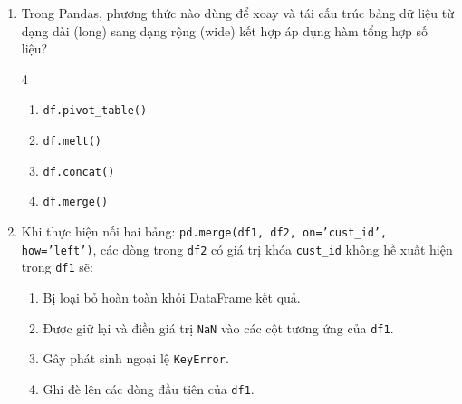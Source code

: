 \documentclass[11pt,a4paper]{article}
\begin{document}
\begin{enumerate}[leftmargin=*,itemsep=2.5pt,resume]
\item Trong Pandas, phương thức nào dùng để xoay và tái cấu trúc bảng dữ liệu từ dạng dài (long) sang dạng rộng (wide) kết hợp áp dụng hàm tổng hợp số liệu?
\begin{multicols}{4}
\begin{enumerate}[label=\Alph*.]
  \item \texttt{df.pivot\_table()}
  \item \texttt{df.melt()}
  \item \texttt{df.concat()}
  \item \texttt{df.merge()}
\end{enumerate}
\end{multicols}

\item Khi thực hiện nối hai bảng: \texttt{pd.merge(df1, df2, on='cust\_id', how='left')}, các dòng trong \texttt{df2} có giá trị khóa \texttt{cust\_id} không hề xuất hiện trong \texttt{df1} sẽ:
\begin{enumerate}[label=\Alph*.]
  \item Bị loại bỏ hoàn toàn khỏi DataFrame kết quả.
  \item Được giữ lại và điền giá trị \texttt{NaN} vào các cột tương ứng của \texttt{df1}.
  \item Gây phát sinh ngoại lệ \texttt{KeyError}.
  \item Ghi đè lên các dòng đầu tiên của \texttt{df1}.
\end{enumerate}

\end{enumerate}
\end{document}
